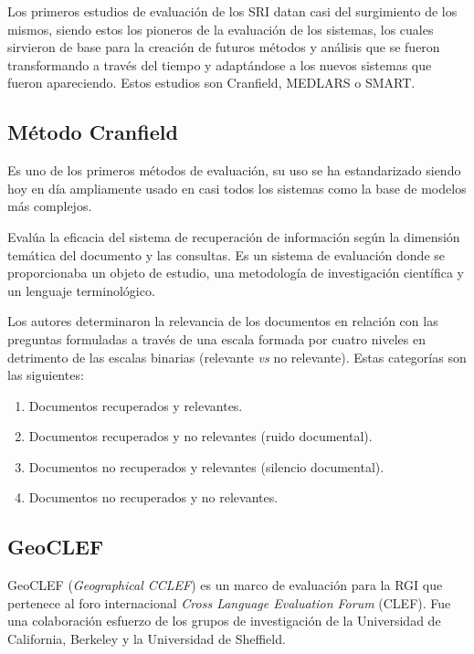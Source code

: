 \documentclass{llncs}
\begin{document}
Los primeros estudios de evaluación de los SRI datan casi del surgimiento de
los mismos, siendo estos los pioneros de la evaluación de los sistemas, los
cuales sirvieron de base para la creación de futuros métodos y análisis que
se fueron transformando a través del tiempo y adaptándose a los nuevos
sistemas que fueron apareciendo. Estos estudios son Cranfield,
MEDLARS o SMART. \cite{bors2000}

\subsection{Método Cranfield}\label{sec:Cranfield}

Es uno de los primeros métodos de evaluación, su uso se ha estandarizado 
siendo hoy en día ampliamente usado en casi todos los sistemas como la base de
modelos más complejos.\cite{hosseini2013}

Evalúa la eficacia del sistema de recuperación de información según la
dimensión temática del documento y las consultas. Es un sistema de evaluación
donde se proporcionaba un objeto de estudio, una metodología de investigación
científica y un lenguaje terminológico.

Los autores determinaron la relevancia de los documentos en relación
con las preguntas formuladas a través de una escala formada por cuatro niveles
en detrimento de las escalas binarias (relevante \emph{vs} no relevante).
Estas categorías son las siguientes: 

\begin{enumerate}
    \item Documentos recuperados y relevantes.
    \item Documentos recuperados y no relevantes (ruido documental).
    \item Documentos no recuperados y relevantes (silencio documental).
    \item Documentos no recuperados y no relevantes. 
\end{enumerate}

\subsection{GeoCLEF}\label{sec:GeoCLEF}

GeoCLEF (\emph{Geographical CCLEF}) es un marco de evaluación para la RGI que
pertenece al foro internacional \emph{Cross Language Evaluation Forum} (CLEF).
Fue una colaboración esfuerzo de los grupos de investigación de la Universidad
de California, Berkeley y la Universidad de Sheffield.
\cite{gey2005,kornai2005}
\end{document}
